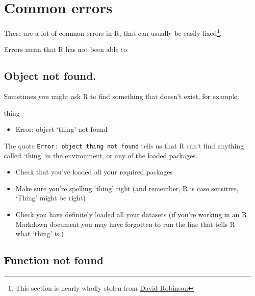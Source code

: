 \documentclass[
]{book}
\newenvironment{Shaded}{\begin{snugshade}}{\end{snugshade}}
\newcommand{\NormalTok}[1]{#1}
\providecommand{\tightlist}{%
  \setlength{\itemsep}{0pt}\setlength{\parskip}{0pt}}
\begin{document}
\hypertarget{trouble_errors}{%
\section{Common errors}\label{trouble_errors}}

There are a lot of common errors in R, that can usually be easily fixed\footnote{This section is nearly wholly stolen from \href{http://varianceexplained.org/courses/errors/}{David Robinson}}.

Errors mean that R has not been able to

\hypertarget{object-not-found.}{%
\subsection{Object not found.}\label{object-not-found.}}

Sometimes you might ask R to find something that doesn't exist, for example:

\begin{Shaded}
\begin{Highlighting}[]
\NormalTok{thing}
\end{Highlighting}
\end{Shaded}

\begin{itemize}
\tightlist
\item
  Error: object `thing' not found
\end{itemize}

The quote \texttt{Error:\ object\ \textquotesingle{}thing\textquotesingle{}\ not\ found} tells us that R can't find anything called `thing' in the environment, or any of the loaded packages.

\begin{itemize}
\item
  Check that you've loaded all your required packages
\item
  Make sure you're spelling `thing' right (and remember, R is case sensitive, `Thing' might be right)
\item
  Check you have definitely loaded all your datasets (if you're working in an R Markdown document you may have forgotten to run the line that tells R what `thing' is.)
\end{itemize}

\hypertarget{function-not-found}{%
\subsection{Function not found}\label{function-not-found}}
\end{document}
